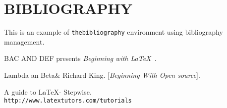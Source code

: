 \documentclass{article}
\begin{document}
\section*{BIBLIOGRAPHY}
This is an example of \texttt{thebibliography} environment using bibliography management.
 
\begin{thebibliography}{9}
BAC AND DEF presents   
\textit{Beginning with \LaTeX\ }.
 
Lambda an Beta\& Richard King.
[\textit{Beginning With Open source}]. 
 
A guide to \LaTeX - Stepwise.
\\\texttt{http://www.latextutors.com/tutorials}

\end{thebibliography}
\end{document}
